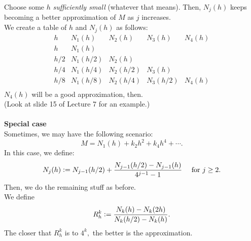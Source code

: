 \documentclass[12pt]{article}
\theoremstyle{definition}
\begin{document}
\begin{enumerate}
	Choose some $h$ \emph{sufficiently small} (whatever that means). Then, $N_j(h)$ keeps becoming a better approximation of $M$ as $j$ increases.\\
	We create a table of $h$ and $N_j(h)$ as follows:\\
		\[
		\begin{array}{c|c|c|c|c}
			h & N_1(h) & N_2(h) & N_3(h) & N_4(h)\\
			\hline
			h & N_1(h) & & &\\
			h/2 & N_1(h/2) & N_2(h) & & \\
			h/4 & N_1(h/4) & N_2(h/2) & N_3(h) & \\
			h/8 & N_1(h/8) & N_2(h/4) & N_3(h/2) & N_4(h) \\
		\end{array}
		\]
	$N_4(h)$ will be a good approximation, then.\\
	(Look at slide 15 of Lecture 7 for an example.)\\~\\
	\textbf{Special case}\\
	Sometimes, we may have the following scenario:
	\[M = N_1(h) + k_2h^2 + k_4h^4 + \cdots.\]
	In this case, we define:
	\[N_j(h) \vcentcolon= N_{j-1}(h/2) + \frac{N_{j-1}(h/2) - N_{j-1}(h)}{4^{j-1} - 1} \quad \text{ for } j \ge 2.\]
	Then, we do the remaining stuff as before.\\
	We define 
	\[R_h^k \vcentcolon= \frac{N_k(h) - N_k(2h)}{N_k(h/2) - N_k(h)}.\]
	The closer that $R_h^k$ is to $4^k,$ the better is the approximation.
\end{enumerate}
\end{document}
